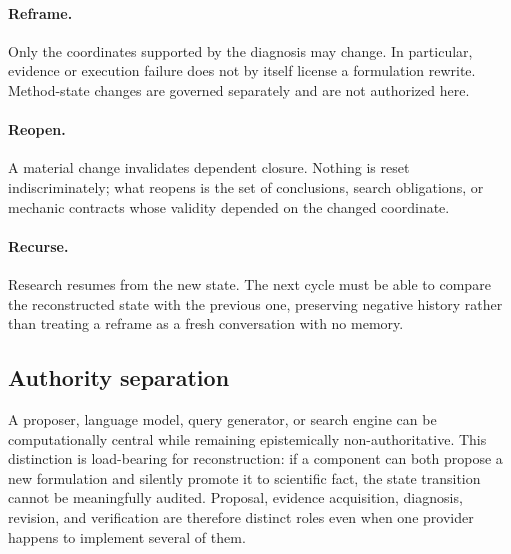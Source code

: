 \paragraph{Reframe.}
Only the coordinates supported by the diagnosis may change. In particular, evidence or execution failure does not by itself license a formulation rewrite. Method-state changes are governed separately and are not authorized here.

\paragraph{Reopen.}
A material change invalidates dependent closure. Nothing is reset indiscriminately; what reopens is the set of conclusions, search obligations, or mechanic contracts whose validity depended on the changed coordinate.

\paragraph{Recurse.}
Research resumes from the new state. The next cycle must be able to compare the reconstructed state with the previous one, preserving negative history rather than treating a reframe as a fresh conversation with no memory.

\subsection{Authority separation}

A proposer, language model, query generator, or search engine can be computationally central while remaining epistemically non-authoritative. This distinction is load-bearing for reconstruction: if a component can both propose a new formulation and silently promote it to scientific fact, the state transition cannot be meaningfully audited. Proposal, evidence acquisition, diagnosis, revision, and verification are therefore distinct roles even when one provider happens to implement several of them.
